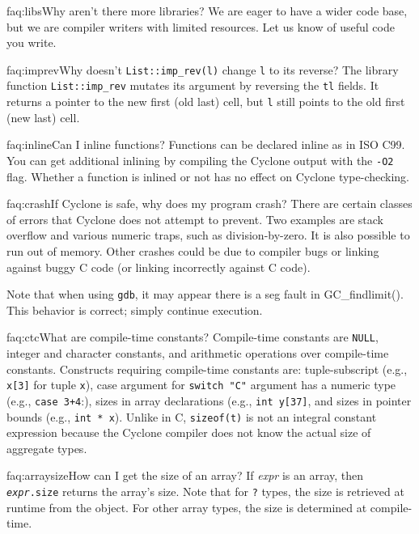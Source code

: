 \begin{faqa}{faq:libs}{Why aren't there more libraries?}
We are eager to have a wider code base, but we are compiler writers
with limited resources.  Let us know of useful code you write.
\end{faqa}

\begin{faqa}{faq:imprev}{Why doesn't \texttt{List::imp_rev(l)} change \texttt{l} to its reverse?} 
The library function \texttt{List::imp_rev} mutates its argument by
reversing the \texttt{tl} fields.  It returns a pointer to the new
first (old last) cell, but \texttt{l} still points to the old first
(new last) cell.
\end{faqa}

\begin{faqa}{faq:inline}{Can I inline functions?}
Functions can be declared inline as in ISO C99.  You can get additional
inlining by compiling the Cyclone output with the \texttt{-O2} flag.
Whether a function is inlined or not has no effect on Cyclone
type-checking.
\end{faqa}

\begin{faqa}{faq:crash}{If Cyclone is safe, why does my program crash?}
There are certain classes of errors that Cyclone does not attempt to
prevent.  Two examples are stack overflow and various numeric traps,
such as division-by-zero.  It is also possible to run out of memory.
Other crashes could be due to compiler bugs or linking against buggy C
code (or linking incorrectly against C code).

Note that when using \texttt{gdb}, it may appear there is a seg fault
in GC_findlimit().  This behavior is correct; simply continue
execution.
\end{faqa}

\begin{faqa}{faq:ctc}{What are compile-time constants?}
Compile-time constants are \texttt{NULL}, integer and character
constants, and arithmetic operations over compile-time constants.
Constructs requiring compile-time constants are: tuple-subscript
(e.g.,
\texttt{x[3]} for tuple \texttt{x}), case argument for 
\texttt{switch "C"} argument has a numeric type (e.g., \texttt{case
  3+4}:), sizes in array declarations (e.g., \texttt{int y[37]}, and
sizes in pointer bounds (e.g., \texttt{int * x\rb}).  Unlike in
C, \texttt{sizeof(t)} is not an integral constant expression because
the Cyclone compiler does not know the actual size of aggregate types.
\end{faqa}

\begin{faqa}{faq:arraysize}{How can I get the size of an array?}
If \textit{expr} is an array, then \texttt{{\it expr}.size} returns
the array's size.  Note that for \texttt{?} types, the size is
retrieved at runtime from the object.  For other array types,
the size is determined at compile-time.
\end{faqa}

